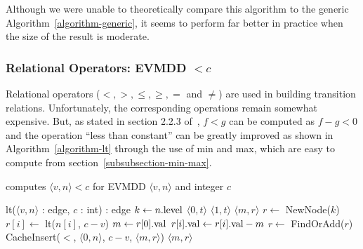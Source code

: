 \documentclass[a4paper,oneside,11pt,pdftex]{llncs}
\newcommand{\BLANK}{\STATE \vspace{-0.6em}}
\newcommand{\edge}[2]{\langle #1, #2 \rangle}
\newcommand{\val}[1]{#1{\rm .val}}
\newcommand{\level}[1]{#1{\rm .level}}
\begin{document}
Although we were unable to theoretically compare this algorithm to
the generic Algorithm~\vref{algorithm-generic}, it seems to perform
far better in practice when the size of the result is moderate.

\subsubsection{Relational Operators: EVMDD $< c$}

Relational operators ($<, >, \leq, \geq, =$ and $\neq$) are
used in building transition relations.
Unfortunately, the corresponding operations remain somewhat expensive.
But, as stated in section
2.2.3 of~\cite{Lai1996}, $f < g$ can be computed as $f-g < 0$ and
the operation ``less than constant'' can be greatly improved
as shown in Algorithm~\vref{algorithm-lt} through
the use of min and max, which are easy to compute from section~\vref{subsubsection-min-max}.
\begin{algorithm}[htbp]
  \caption{computes $\edge{v}{n} < c$ for EVMDD $\edge{v}{n}$ and integer $c$}
  \label{algorithm-lt}
  \begin{algorithmic}
    \item[lt($\edge{v}{n}$ : edge, $c$ : int) : edge]
    \STATE $k \gets \level{n}$
    \BLANK
    \STATE {}
      \RETURN $\edge{0}{t}$ 
    \ENDIF
      \RETURN $\edge{1}{t}$ 
    \ENDIF
    \BLANK
    \STATE {}
    \IF{CacheFind($<$, $\edge{0}{n}$, $c-v$, $\edge{m}{r}$)}
      \RETURN $\edge{m}{r}$
    \ENDIF
    \BLANK
    \STATE $r \gets$ NewNode($k$)
      \STATE $r[i] \gets$ lt($n[i]$, $c-v$)
    \ENDFOR
    \STATE $m \gets \val{r[0]}$
      \STATE $\val{r[i]} \gets \val{r[i]}-m$
    \ENDFOR
    \BLANK
    \STATE {}
    \STATE $r \gets$ FindOrAdd($r$)
    \BLANK
    \STATE {}
    \STATE CacheInsert($<$, $\edge{0}{n}$, $c-v$, $\edge{m}{r}$)
    \BLANK
    \RETURN $\edge{m}{r}$
  \end{algorithmic}
\end{algorithm}
\end{document}
